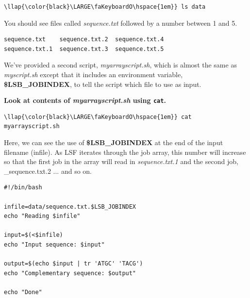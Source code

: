 \documentclass[11pt]{article}
\begin{document}
\begin{terminalinput}
\begin{Verbatim}[commandchars=\\\{\}]
\llap{\color{black}\LARGE\faKeyboardO\hspace{1em}} ls data
\end{Verbatim}
\end{terminalinput}



    You should see files called \textit{sequence.txt} followed by a number
between 1 and 5.

    \begin{verbatim}
sequence.txt    sequence.txt.2  sequence.txt.4
sequence.txt.1  sequence.txt.3  sequence.txt.5
\end{verbatim}

\newpage

    We've provided a second script, \textit{myarrayscript.sh}, which is almost
the same as \textit{myscript.sh} except that it includes an environment
variable, \textbf{\$LSB\_JOBINDEX}, to tell the script which file to use
as input.

\textbf{Look at contents of \textit{myarrayscript.sh} using \texttt{cat}.}

\begin{terminalinput}
\begin{Verbatim}[commandchars=\\\{\}]
\llap{\color{black}\LARGE\faKeyboardO\hspace{1em}} cat myarrayscript.sh
\end{Verbatim}
\end{terminalinput}


    Here, we can see the use of \textbf{\$LSB\_JOBINDEX} at the end of the
input filename (infile). As LSF iterates through the job array, this
number will increase so that the first job in the array will read in
\textit{sequence.txt.1} and the second job, \_sequence.txt.2 ... and so
on.

    \begin{verbatim}
#!/bin/bash

infile=data/sequence.txt.$LSB_JOBINDEX
echo "Reading $infile"

input=$(<$infile)
echo "Input sequence: $input"

output=$(echo $input | tr 'ATGC' 'TACG')
echo "Complementary sequence: $output"

echo "Done"
\end{verbatim}
\end{document}
